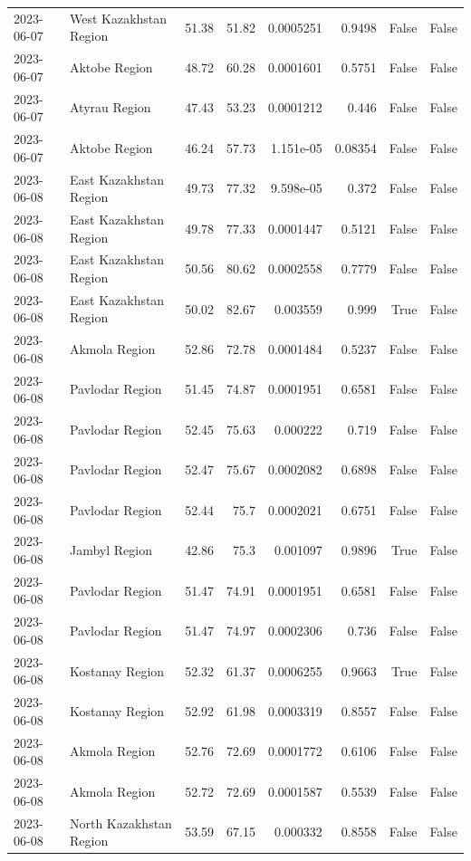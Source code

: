\begin{table}
\begin{tabular}{llrrrrrr}
2023-06-07 & West Kazakhstan Region & 51.38 & 51.82 & 0.0005251 & 0.9498 & False & False \\
2023-06-07 & Aktobe Region & 48.72 & 60.28 & 0.0001601 & 0.5751 & False & False \\
2023-06-07 & Atyrau Region & 47.43 & 53.23 & 0.0001212 & 0.446 & False & False \\
2023-06-07 & Aktobe Region & 46.24 & 57.73 & 1.151e-05 & 0.08354 & False & False \\
2023-06-08 & East Kazakhstan Region & 49.73 & 77.32 & 9.598e-05 & 0.372 & False & False \\
2023-06-08 & East Kazakhstan Region & 49.78 & 77.33 & 0.0001447 & 0.5121 & False & False \\
2023-06-08 & East Kazakhstan Region & 50.56 & 80.62 & 0.0002558 & 0.7779 & False & False \\
2023-06-08 & East Kazakhstan Region & 50.02 & 82.67 & 0.003559 & 0.999 & True & False \\
2023-06-08 & Akmola Region & 52.86 & 72.78 & 0.0001484 & 0.5237 & False & False \\
2023-06-08 & Pavlodar Region & 51.45 & 74.87 & 0.0001951 & 0.6581 & False & False \\
2023-06-08 & Pavlodar Region & 52.45 & 75.63 & 0.000222 & 0.719 & False & False \\
2023-06-08 & Pavlodar Region & 52.47 & 75.67 & 0.0002082 & 0.6898 & False & False \\
2023-06-08 & Pavlodar Region & 52.44 & 75.7 & 0.0002021 & 0.6751 & False & False \\
2023-06-08 & Jambyl Region & 42.86 & 75.3 & 0.001097 & 0.9896 & True & False \\
2023-06-08 & Pavlodar Region & 51.47 & 74.91 & 0.0001951 & 0.6581 & False & False \\
2023-06-08 & Pavlodar Region & 51.47 & 74.97 & 0.0002306 & 0.736 & False & False \\
2023-06-08 & Kostanay Region & 52.32 & 61.37 & 0.0006255 & 0.9663 & True & False \\
2023-06-08 & Kostanay Region & 52.92 & 61.98 & 0.0003319 & 0.8557 & False & False \\
2023-06-08 & Akmola Region & 52.76 & 72.69 & 0.0001772 & 0.6106 & False & False \\
2023-06-08 & Akmola Region & 52.72 & 72.69 & 0.0001587 & 0.5539 & False & False \\
2023-06-08 & North Kazakhstan Region & 53.59 & 67.15 & 0.000332 & 0.8558 & False & False \\

\end{tabular}
\end{table}
